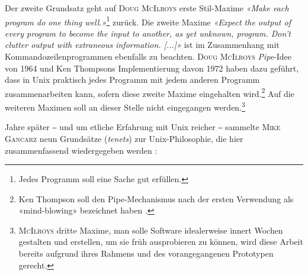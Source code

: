Der zweite Grundsatz geht auf \textsc{Doug McIlroys} erste Stil-Maxime \cite[S. 3]{unixtimesharing} \textit{«Make each program do one thing well.»}\footnote{Jedes Programm soll eine Sache gut erfüllen.} zurück. Die zweite Maxime \textit{«Expect the output of every program to become the input to another, as yet unknown, program. Don't clutter output with extraneous information. [...]»} ist im Zusammenhang mit Kommandozeilenprogrammen ebenfalls zu beachten. \textsc{Doug McIlroys} \textit{Pipe}-Idee von 1964 und Ken Thompsons Implementierung davon 1972 haben dazu geführt, dass in Unix praktisch jedes Programm mit jedem anderen Programm zusammenarbeiten kann, sofern diese zweite Maxime eingehalten wird.\footnote{Ken Thompson soll den Pipe-Mechanismus nach der ersten Verwendung als «mind-blowing» bezeichnet haben \cite[Kapitel 4.4, S. 68-69]{unix-history-memoir}.} Auf die weiteren Maximen soll an dieser Stelle nicht eingegangen werden.\footnote{\textsc{McIlroys} dritte Maxime, man solle Software idealerweise innert Wochen gestalten und erstellen, um sie früh ausprobieren zu können, wird diese Arbeit bereits aufgrund ihres Rahmens und des vorangegangenen Prototypen gerecht.}

Jahre später ‒ und um etliche Erfahrung mit Unix reicher ‒ sammelte \textsc{Mike Gancarz} neun Grundsätze (\textit{tenets}) zur Unix-Philosophie, die hier zusammenfassend wiedergegeben werden \cite{unixphil}:

